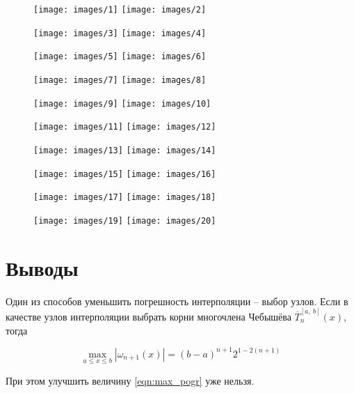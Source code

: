 \documentclass[12pt, a4paper]{article}
\begin{document}
\begin{figure}[H]
	\texttt{[image: images/1]}
	\texttt{[image: images/2]}
\end{figure}

\begin{figure}[H]
	\texttt{[image: images/3]}
	\texttt{[image: images/4]}
\end{figure}

\begin{figure}[H]
	\texttt{[image: images/5]}
	\texttt{[image: images/6]}
\end{figure}

\begin{figure}[H]
	\texttt{[image: images/7]}
	\texttt{[image: images/8]}
\end{figure}

\begin{figure}[H]
	\texttt{[image: images/9]}
	\texttt{[image: images/10]}
\end{figure}

\begin{figure}[H]
	\texttt{[image: images/11]}
	\texttt{[image: images/12]}
\end{figure}

\begin{figure}[H]
	\texttt{[image: images/13]}
	\texttt{[image: images/14]}
\end{figure}

\begin{figure}[H]
	\texttt{[image: images/15]}
	\texttt{[image: images/16]}
\end{figure}

\begin{figure}[H]
	\texttt{[image: images/17]}
	\texttt{[image: images/18]}
\end{figure}

\begin{figure}[H]
	\texttt{[image: images/19]}
	\texttt{[image: images/20]}
\end{figure}

\section{Выводы}
		
Один из способов уменьшить погрешность интерполяции -- выбор узлов. Если в качестве узлов интерполяции выбрать корни многочлена Чебышёва $\overline{T}_n^{[a,\ b]}(x)$, тогда 

\begin{equation}
	\max_{a \leq x \leq b}|\omega_{n+1}(x)| = (b-a)^{n+1}2^{1-2(n+1)}
	\label{eqn:max_pogr}
\end{equation}

При этом улучшить величину \eqref{eqn:max_pogr} уже нельзя.
\end{document}

